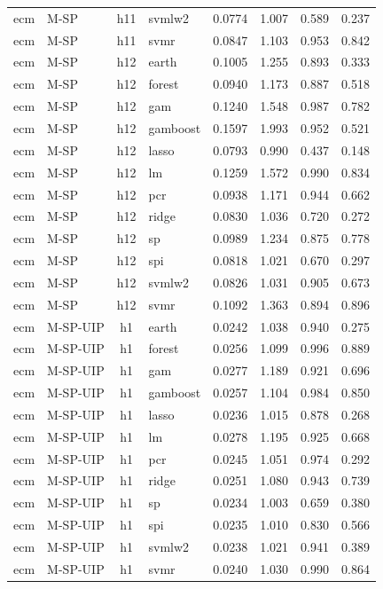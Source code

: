 \begin{ThreePartTable}
\begin{longtable}[t]{llclcccc}
ecm & M-SP & h11 & svmlw2 & 0.0774 & 1.007 & 0.589 & 0.237\\
ecm & M-SP & h11 & svmr & 0.0847 & 1.103 & 0.953 & 0.842\\
\addlinespace
ecm & M-SP & h12 & earth & 0.1005 & 1.255 & 0.893 & 0.333\\
ecm & M-SP & h12 & forest & 0.0940 & 1.173 & 0.887 & 0.518\\
ecm & M-SP & h12 & gam & 0.1240 & 1.548 & 0.987 & 0.782\\
ecm & M-SP & h12 & gamboost & 0.1597 & 1.993 & 0.952 & 0.521\\
ecm & M-SP & h12 & lasso & 0.0793 & 0.990 & 0.437 & 0.148\\
ecm & M-SP & h12 & lm & 0.1259 & 1.572 & 0.990 & 0.834\\
ecm & M-SP & h12 & pcr & 0.0938 & 1.171 & 0.944 & 0.662\\
ecm & M-SP & h12 & ridge & 0.0830 & 1.036 & 0.720 & 0.272\\
ecm & M-SP & h12 & sp & 0.0989 & 1.234 & 0.875 & 0.778\\
ecm & M-SP & h12 & spi & 0.0818 & 1.021 & 0.670 & 0.297\\
ecm & M-SP & h12 & svmlw2 & 0.0826 & 1.031 & 0.905 & 0.673\\
ecm & M-SP & h12 & svmr & 0.1092 & 1.363 & 0.894 & 0.896\\
\addlinespace
ecm & M-SP-UIP & h1 & earth & 0.0242 & 1.038 & 0.940 & 0.275\\
ecm & M-SP-UIP & h1 & forest & 0.0256 & 1.099 & 0.996 & 0.889\\
ecm & M-SP-UIP & h1 & gam & 0.0277 & 1.189 & 0.921 & 0.696\\
ecm & M-SP-UIP & h1 & gamboost & 0.0257 & 1.104 & 0.984 & 0.850\\
ecm & M-SP-UIP & h1 & lasso & 0.0236 & 1.015 & 0.878 & 0.268\\
ecm & M-SP-UIP & h1 & lm & 0.0278 & 1.195 & 0.925 & 0.668\\
ecm & M-SP-UIP & h1 & pcr & 0.0245 & 1.051 & 0.974 & 0.292\\
ecm & M-SP-UIP & h1 & ridge & 0.0251 & 1.080 & 0.943 & 0.739\\
ecm & M-SP-UIP & h1 & sp & 0.0234 & 1.003 & 0.659 & 0.380\\
ecm & M-SP-UIP & h1 & spi & 0.0235 & 1.010 & 0.830 & 0.566\\
ecm & M-SP-UIP & h1 & svmlw2 & 0.0238 & 1.021 & 0.941 & 0.389\\
ecm & M-SP-UIP & h1 & svmr & 0.0240 & 1.030 & 0.990 & 0.864\\

\end{longtable}
\end{ThreePartTable}
